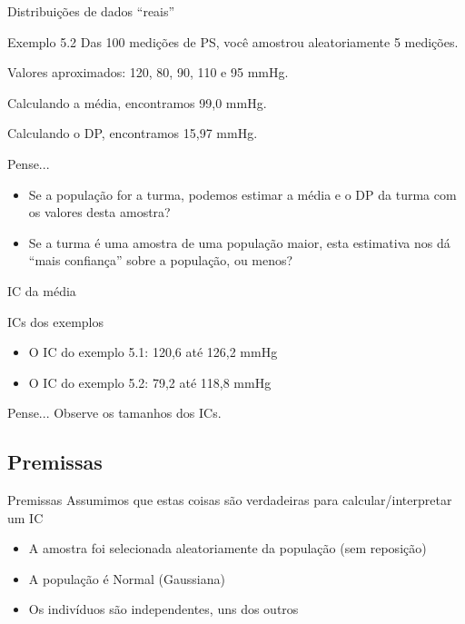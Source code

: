 \documentclass{beamer}
\begin{document}
\begin{frame}{Distribuições de dados ``reais''}
  \begin{exampleblock}{Exemplo 5.2}
    Das 100 medições de PS, você amostrou aleatoriamente 5 medições.

    Valores aproximados: 120, 80, 90, 110 e 95 mmHg.

    Calculando a média, encontramos 99,0 mmHg.

    Calculando o DP, encontramos 15,97 mmHg.
  \end{exampleblock}
  \begin{block}{Pense...}
    \begin{itemize}
    \item Se a população for a turma, podemos estimar a média e o DP da turma com os valores desta amostra?
    \item Se a turma é uma amostra de uma população maior, esta estimativa nos dá ``mais confiança'' sobre a população, ou menos?
    \end{itemize}
  \end{block}
\end{frame}

\begin{frame}{IC da média}
  \begin{exampleblock}{ICs dos exemplos}
    \begin{itemize}
    \item O IC do exemplo 5.1: 120,6 até 126,2 mmHg
    \item O IC do exemplo 5.2: 79,2 até 118,8 mmHg
    \end{itemize}
  \end{exampleblock}
  \begin{block}{Pense...}
    Observe os tamanhos dos ICs.
  \end{block}
\end{frame}

\subsection{Premissas}

\begin{frame}{Premissas}
  Assumimos que estas coisas são verdadeiras para calcular/interpretar um IC
  \begin{itemize}
  \item A amostra foi selecionada aleatoriamente da população (sem reposição)
  \item A população é Normal (Gaussiana)
  \item Os indivíduos são independentes, uns dos outros
  \end{itemize}
\end{frame}
\end{document}
